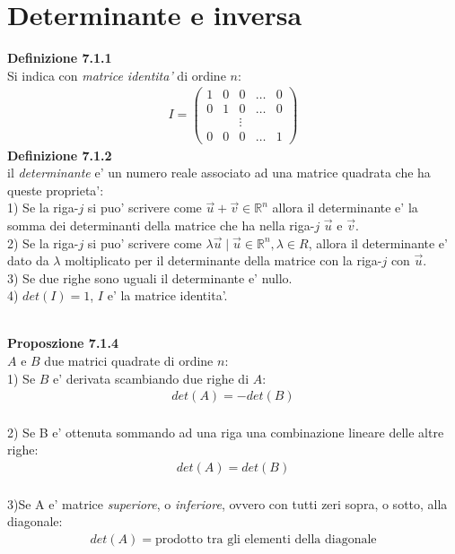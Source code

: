 \documentclass{article}
\begin{document}
\pagebreak
\section{Determinante e inversa}
\textbf{Definizione 7.1.1}
\\Si indica con \textit{matrice identita'} di ordine $n$:
\begin{align*}
  I=\begin{pmatrix}
    1&0&0&\dots&0 \\
    0&1&0&\dots&0 \\
    &&\vdots \\
    0&0&0&\dots&1 
  \end{pmatrix}
\end{align*}
\textbf{Definizione 7.1.2}
\\il \textit{determinante} e' un numero reale associato ad una matrice quadrata che ha queste proprieta':
\\1) Se la riga-$j$ si puo' scrivere come $\vec{u}+\vec{v}\in \mathbb{R}^n$ allora il determinante e' la somma dei determinanti della matrice che ha nella riga-$j$ $\vec{u}$ e $\vec{v}$.
\\2) Se la riga-$j$ si puo' scrivere come $\lambda \vec{u} \mid \vec{u}\in \mathbb{R}^n, \lambda \in R $, allora il determinante e' dato da $\lambda$ moltiplicato per il determinante della matrice con la riga-$j$ con $\vec{u}$.
\\3) Se due righe sono uguali il determinante e' nullo.
\\4) $det(I)=1$, $I$ e' la matrice identita'.

\textbf{\\Proposzione 7.1.4}
\\$A$ e $B$ due matrici quadrate di ordine $n$:
\vspace{2px}
\\1) Se $B$ e' derivata scambiando due righe di $A$:
\begin{align*}
  det(A)=-det(B)
\end{align*}
\vspace{2px}
\\2) Se B e' ottenuta sommando ad una riga una combinazione lineare delle altre righe:
\begin{align*}
  det(A)=det(B)
\end{align*}
\vspace{2px}
\\3)Se A e' matrice \textit{superiore}, o \textit{inferiore}, ovvero con tutti zeri sopra, o sotto, alla diagonale:
\begin{align*}
  det(A)=\text{prodotto tra gli elementi della diagonale}
\end{align*}
\end{document}
